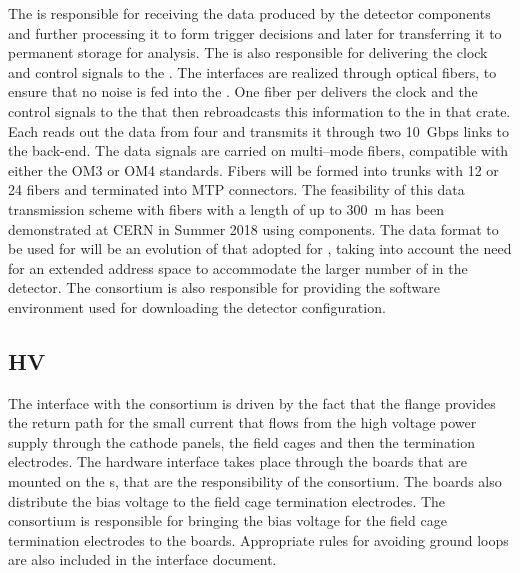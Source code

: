 The  is responsible for receiving the data produced by the
 detector components and further processing it to
form trigger decisions and later for transferring it to 
permanent storage for analysis. The 
 is also responsible for delivering the clock and control
signals to the . The interfaces are realized 
through optical fibers, to ensure that no noise is fed into
the . One fiber per  delivers the
clock and the control signals to the  that then
rebroadcasts this information to the  in that 
crate. Each  reads out the data from four 
and transmits it through two 10~Gbps links to the  back-end.
The data signals are carried on multi--mode fibers, compatible with 
either the OM3 or OM4 standards. Fibers will be formed into trunks with 
12 or 24 fibers and terminated into MTP connectors. The feasibility
of this data transmission scheme with fibers with a length of up
to 300~m has been demonstrated at CERN in Summer 2018 using 
 components. The data format to be used for 
 will be an evolution of that adopted for
, taking into account the need for an 
extended address space to accommodate the larger number of
 in the detector. The  consortium
is also responsible for providing the software environment
used for downloading the detector configuration.

\subsection{HV}
\label{sec:fdsp-tpcelec-interfaces-hv}

The interface with the  consortium
is driven by the fact that the  flange provides the return path for
the small current that flows from the high voltage power 
supply through the cathode panels, the field cages and then
the termination electrodes. The hardware interface takes place through
the  boards that are mounted on the s, that
are  the responsibility of the  consortium. The
 boards also distribute the bias voltage to the field
cage termination electrodes. The  consortium
is responsible for bringing the bias voltage for the field
cage termination electrodes to the  boards. Appropriate
rules for avoiding ground loops are also included in the 
interface document.

